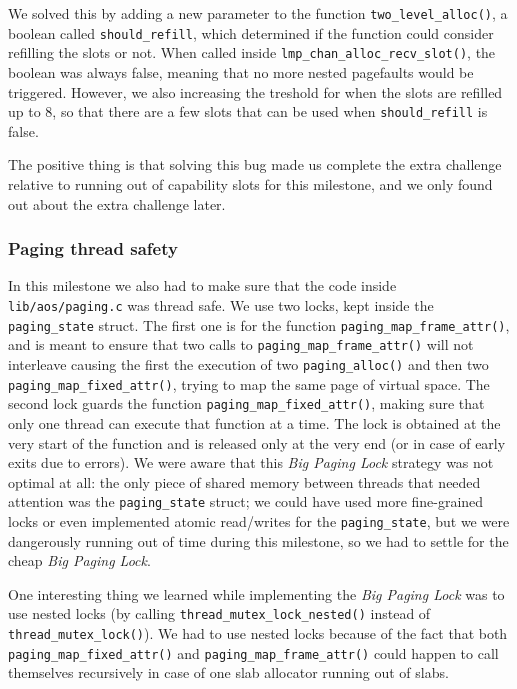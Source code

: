 \documentclass[a4paper,twoside,openright]{report}
\renewcommand{\t}[1]{%
	{\texttt{#1}}}
\begin{document}
We solved this by adding a new parameter to the function
\t{two\_level\_alloc()}, a boolean called \t{should\_refill}, which determined
if the function could consider refilling the slots or not. When called inside
\t{lmp\_chan\_alloc\_recv\_slot()}, the boolean was always false, meaning that
no more nested pagefaults would be triggered.  However, we also increasing the
treshold for when the slots are refilled up to 8, so that there are a few slots
that can be used when \t{should\_refill} is false.

The positive thing is that solving this bug made us complete the extra challenge
relative to running out of capability slots for this milestone, and we only
found out about the extra challenge later.


\subsubsection{Paging thread safety}
In this milestone we also had to make sure that the code inside
\t{lib/aos/paging.c} was thread safe. We use two locks, kept inside the
\t{paging\_state} struct.  The first one is for the function
\t{paging\_map\_frame\_attr()}, and is meant to ensure that two calls to
\t{paging\_map\_frame\_attr()} will not interleave causing the first the
execution of two \t{paging\_alloc()} and then two
\t{paging\_map\_fixed\_attr()}, trying to map the same page of virtual space.
The second lock guards the function \t{paging\_map\_fixed\_attr()}, making sure
that only one thread can execute that function at a time. The lock is obtained
at the very start of the function and is released only at the very end (or in
case of early exits due to errors). We were aware that this \emph{Big Paging
Lock} strategy was not optimal at all: the only piece of shared memory between
threads that needed attention was the \t{paging\_state} struct; we could have
used more fine-grained locks or even implemented atomic read/writes for the
\t{paging\_state}, but we were dangerously running out of time during this
milestone, so we had to settle for the cheap \emph{Big Paging Lock}.

One interesting thing we learned while implementing the \emph{Big Paging Lock}
was to use nested locks (by calling \t{thread\_mutex\_lock\_nested()} instead
of \t{thread\_mutex\_lock()}).  We had to use nested locks because of the fact
that both \t{paging\_map\_fixed\_attr()} and \t{paging\_map\_frame\_attr()}
could happen to call themselves recursively in case of one slab allocator
running out of slabs.
\end{document}

